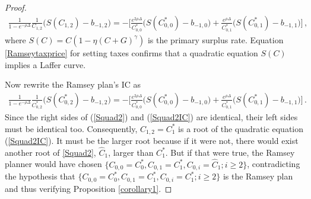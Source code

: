 \documentclass[12pt]{article}
\newcommand{\WJ}[1]{{\textcolor{red}{#1}}}
\begin{document}
\begin{proof}
		\begin{align} \label{Squad2}
			\frac{1}{1-e^{-\rho\Delta}}\frac{1}{C_{1, 2}}\big(S(C_{1, 2})-b_{-1, 2}\big)%
			=- \bigg[ \frac{e^{2\rho\Delta}}{C_{0, 0}^*}\big(S(C_{0, 0}^*) - b_{-1, 0} \big) + \frac{ e^{\rho \Delta } }{C_{0, 1}^*}\big(S(C_{0, 1}^*)-b_{-1, 1} \big) \bigg]\,,
	\end{align} 
	where $S(C) = C\left(1-\eta(C+G)^\gamma \right)$ is the primary surplus rate.   
	Equation \eqref{Ramseytaxprice} for setting taxes confirms  that a quadratic equation $S(C)$ implies  a Laffer curve. 
   
    Now rewrite the Ramsey plan's  IC as  %
    		\begin{align} \label{Squad2IC}
    	\frac{1}{1-e^{-\rho\Delta}}\frac{1}{C_{0, 2}^*}\big(S(C_{0, 2}^*)-b_{-1, 2}\big)%
    	=- \bigg[ \frac{e^{2\rho\Delta}}{C_{0, 0}^*}\big(S(C_{0, 0}^*) - b_{-1, 0} \big) + \frac{ e^{\rho \Delta } }{C_{0, 1}^*}\big(S(C_{0, 1}^*)-b_{-1, 1} \big) \bigg]\, . 
    \end{align} 
Since  the right sides of (\ref{Squad2}) and (\ref{Squad2IC}) are identical,  their left sides must be identical too. 
Consequently, $C_{1, 2}=C_1^*$ is a root of the quadratic equation (\ref{Squad2IC}). It must be the larger root because if it were  not, there would exist another root of \eqref{Squad2}, $\widehat{C}_1$, larger than $C_1^*$. But if that were true, 
		the Ramsey planner would have chosen $\{ C_{0, 0}=C_{0}^*, C_{0, 1}=C_1^*, C_{0, i}=\widehat{C}_1; i\geq 2 \}$, contradicting the hypothesis that $\{ C_{0, 0}=C_{0}^*, C_{0, 1}=C_1^*, C_{0, i}={C}_1^\ast; i\geq 2 \}$ is the Ramsey plan and thus verifying Proposition \ref{corollary1}.%
\end{proof}
\end{document}
